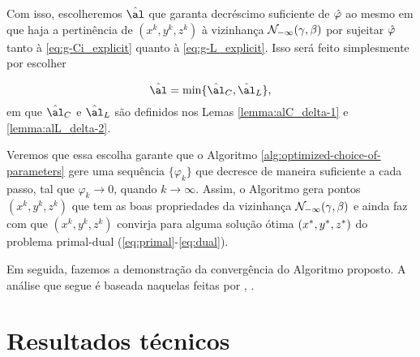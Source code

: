 Com isso, escolheremos  $\hat\al$ que garanta decréscimo suficiente de $\hat{\varphi}$ ao mesmo em que haja a pertinência de $({x}^{k} ,{y}^{k},{z}^{k})$ à vizinhança $\mathcal{N}_{-\infty}(\gamma,\beta)$ por sujeitar $\hat{\varphi}$ tanto à  \eqref{eq:g-Ci_explicit} quanto à \eqref{eq:g-L_explicit}. Isso será feito simplesmente por escolher

\begin{equation}
	\label{eq:nex-al}
\nextal = \min\{\nextal_{C},\nextal_{L}\},
\end{equation}
em que $\nextal_{C}$ e $\nextal_{L}$ são definidos nos Lemas \ref{lemma:alC_delta-1} e  \ref{lemma:alL_delta-2}.

  




Veremos que essa escolha garante que  o Algoritmo \ref{alg:optimized-choice-of-parameters} gere uma sequência $\{\varphi_k\}$ que decresce de maneira suficiente a cada passo, tal que $\varphi_k \to 0$, quando $k\to \infty$. Assim, o Algoritmo gera pontos $({x}^{k} ,{y}^{k},{z}^{k})$ que tem as boas propriedades da vizinhança $\mathcal{N}_{-\infty}(\gamma,\beta)$ e ainda faz com que $({x}^{k} ,{y}^{k},{z}^{k})$ convirja para  alguma solução ótima $(x^* ,y^*,z^*)$ do problema primal-dual  (\ref{eq:primal}-\ref{eq:dual}).


Em seguida, fazemos a demonstração da convergência do Algoritmo proposto. A análise que segue é  baseada naquelas feitas por \textcite[cap. 6]{Wright:Primal-dual-interior-point:1997h},  \textcite{Zhang:2006ic,Zhang:1995fu}. 



\section{Resultados técnicos}



